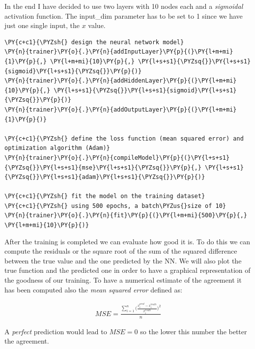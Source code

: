 In the end I have decided to use two layers with 10 nodes each and a
\emph{sigmoidal} activation function. The input\_dim parameter has to be
set to 1 since we have just one single input, the \(x\) value.

    \begin{tcolorbox}[breakable, size=fbox, boxrule=1pt, pad at break*=1mm,colback=cellbackground, colframe=cellborder]
\begin{Verbatim}[commandchars=\\\{\}]
\PY{c+c1}{\PYZsh{} design the neural network model}
\PY{n}{trainer}\PY{o}{.}\PY{n}{addInputLayer}\PY{p}{(}\PY{l+m+mi}{1}\PY{p}{,} \PY{l+m+mi}{10}\PY{p}{,} \PY{l+s+s1}{\PYZsq{}}\PY{l+s+s1}{sigmoid}\PY{l+s+s1}{\PYZsq{}}\PY{p}{)}
\PY{n}{trainer}\PY{o}{.}\PY{n}{addHiddenLayer}\PY{p}{(}\PY{l+m+mi}{10}\PY{p}{,} \PY{l+s+s1}{\PYZsq{}}\PY{l+s+s1}{sigmoid}\PY{l+s+s1}{\PYZsq{}}\PY{p}{)}
\PY{n}{trainer}\PY{o}{.}\PY{n}{addOutputLayer}\PY{p}{(}\PY{l+m+mi}{1}\PY{p}{)}

\PY{c+c1}{\PYZsh{} define the loss function (mean squared error) and optimization algorithm (Adam)}
\PY{n}{trainer}\PY{o}{.}\PY{n}{compileModel}\PY{p}{(}\PY{l+s+s1}{\PYZsq{}}\PY{l+s+s1}{mse}\PY{l+s+s1}{\PYZsq{}}\PY{p}{,} \PY{l+s+s1}{\PYZsq{}}\PY{l+s+s1}{adam}\PY{l+s+s1}{\PYZsq{}}\PY{p}{)}

\PY{c+c1}{\PYZsh{} fit the model on the training dataset}
\PY{c+c1}{\PYZsh{} using 500 epochs, a batch\PYZus{}size of 10}
\PY{n}{trainer}\PY{o}{.}\PY{n}{fit}\PY{p}{(}\PY{l+m+mi}{500}\PY{p}{,} \PY{l+m+mi}{10}\PY{p}{)}
\end{Verbatim}
\end{tcolorbox}

    After the training is completed we can evaluate how good it is. To do
this we can compute the residuals or the square root of the sum of the
squared difference between the true value and the one predicted by the
NN. We will also plot the true function and the predicted one in order
to have a graphical representation of the goodness of our training. To
have a numerical estimate of the agreement it has been computed also the
\emph{mean squared error} defined as:

\begin{align*}
  MSE = \frac{\sum_{i=1}^n{\big(\frac{x_{i}^{pred} - x_i^{truth}}{x_i^{truth}}\big)^2}}{n}
\end{align*}

A \emph{perfect} prediction would lead to \(MSE=0\) so the lower this
number the better the agreement.


